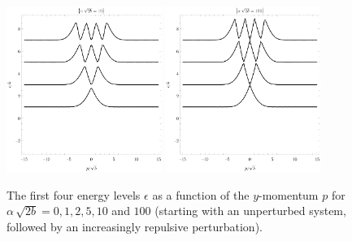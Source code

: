 \begin{figure}[p]
    \\[1em]%
    \includegraphics[width=0.45\textwidth]{grafy/dirac10.pdf}%
    \hspace{0.1\textwidth}%
    \includegraphics[width=0.45\textwidth]{grafy/dirac100.pdf}\par
    \caption{The first four energy levels $\epsilon$ as a function of the $y$-momentum $p$ for $\alpha\,\sqrt{2b} = 0, 1, 2, 5, 10$ and $100$ (starting with an unperturbed system, followed by an increasingly repulsive perturbation).}
    \label{plots-dirac-repulsive}
\end{figure}

